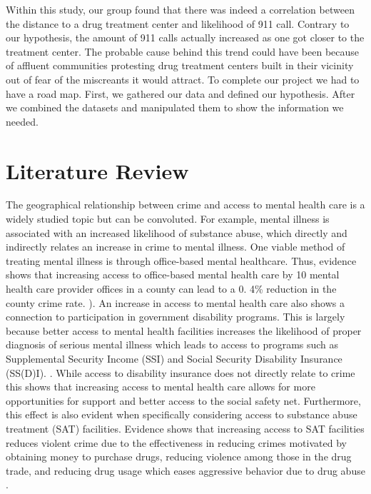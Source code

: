 \documentclass[12pt]{article}
\begin{document}
   Within this study, our group found that there was indeed a correlation between the distance to a drug treatment center and likelihood of 911 call. Contrary to our hypothesis, the amount of 911 calls actually increased as one got closer to the treatment center. The probable cause behind this trend could have been because of affluent communities protesting drug treatment centers built in their vicinity out of fear of the miscreants it would attract. To complete our project we had to have a road map. First, we gathered our data and defined our hypothesis. After we combined the datasets and manipulated them to show the information we needed.



\section{Literature Review} \label{sec:literature}
    The geographical relationship between crime and access to mental health care is a widely studied topic but can be convoluted. For example, mental illness is associated with an increased likelihood of substance abuse, which directly and indirectly relates an increase in crime to mental illness. One viable method of treating mental illness is through office-based mental healthcare. Thus, evidence shows that increasing access to office-based mental health care by 10 mental health care provider offices in a county can lead to a 0. 4\% reduction in the county crime rate. \cite{mental_healthcare_and_crime}). An increase in access to mental health care also shows a connection to participation in government disability programs. This is largely because better access to mental health facilities increases the likelihood of proper diagnosis of serious mental illness which leads to access to programs such as Supplemental Security Income (SSI) and Social Security Disability Insurance (SS(D)I). \cite{mental_health_and_disability}. While access to disability insurance does not directly relate to crime this shows that increasing access to mental health care allows for more opportunities for support and better access to the social safety net. Furthermore, this effect is also evident when specifically considering access to substance abuse treatment (SAT) facilities. Evidence shows that increasing access to SAT facilities reduces violent crime due to the effectiveness in reducing crimes motivated by obtaining money to purchase drugs, reducing violence among those in the drug trade, and reducing drug usage which eases aggressive behavior due to drug abuse \cite{SAT_centers_and_crime}. 
\end{document}
